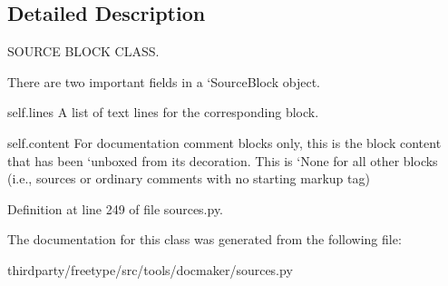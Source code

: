 \subsection{Detailed Description}
S\+O\+U\+R\+CE B\+L\+O\+CK C\+L\+A\+SS. 

There are two important fields in a `\+Source\+Block\textquotesingle{} object.

self.\+lines A list of text lines for the corresponding block.

self.\+content For documentation comment blocks only, this is the block content that has been `unboxed\textquotesingle{} from its decoration. This is `\+None\textquotesingle{} for all other blocks (i.\+e., sources or ordinary comments with no starting markup tag) 

Definition at line 249 of file sources.\+py.



The documentation for this class was generated from the following file\+:\begin{DoxyCompactItemize}
\item 
thirdparty/freetype/src/tools/docmaker/sources.\+py\end{DoxyCompactItemize}
